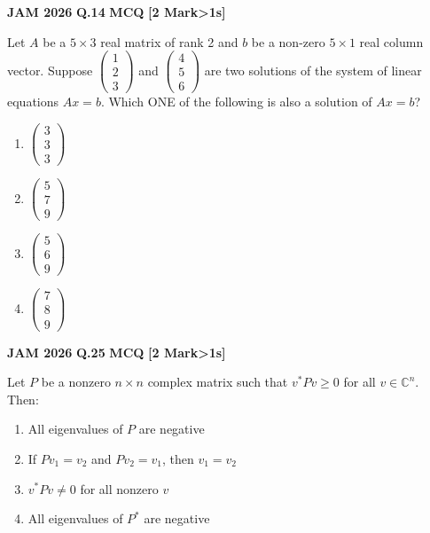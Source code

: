 \documentclass[11pt,a4paper]{article}
\newcommand{\pyqheader}[4]{%
    \noindent\begin{tcolorbox}[
        colback=badgebg,
        colframe=secondary,
        arc=2mm,
        boxrule=0.6pt,
        top=1.5mm,bottom=1.5mm,left=2mm,right=2mm
    ]
        \textbf{\textcolor{primary}{JAM #1}} \hfill \textbf{Q.#2} \hfill \textsc{\textbf{#3}} \hfill \textbf{[#4 Mark\ifnum#4>1s\fi]}
    \end{tcolorbox}\vspace{-1mm}
}
\begin{document}
\pyqheader{2026}{14}{MCQ}{2}
Let $A$ be a $5\times 3$ real matrix of rank 2 and $b$ be a non-zero $5\times 1$ real column vector. Suppose $\begin{pmatrix}1\\2\\3\end{pmatrix}$ and $\begin{pmatrix}4\\5\\6\end{pmatrix}$ are two solutions of the system of linear equations $Ax=b$. Which ONE of the following is also a solution of $Ax=b$?
\begin{enumerate}[label=(\Alph*)]
    \item $\begin{pmatrix}3\\3\\3\end{pmatrix}$
    \item $\begin{pmatrix}5\\7\\9\end{pmatrix}$
    \item $\begin{pmatrix}5\\6\\9\end{pmatrix}$
    \item $\begin{pmatrix}7\\8\\9\end{pmatrix}$
\end{enumerate}

\pyqheader{2026}{25}{MCQ}{2}
Let $P$ be a nonzero $n\times n$ complex matrix such that $v^{*}Pv\ge 0$ for all $v\in\mathbb{C}^{n}$. Then:
\begin{enumerate}[label=(\Alph*)]
    \item All eigenvalues of $P$ are negative
    \item If $Pv_{1}=v_{2}$ and $Pv_{2}=v_{1}$, then $v_{1}=v_{2}$
    \item $v^{*}Pv\ne 0$ for all nonzero $v$
    \item All eigenvalues of $P^{*}$ are negative
\end{enumerate}
\end{document}
